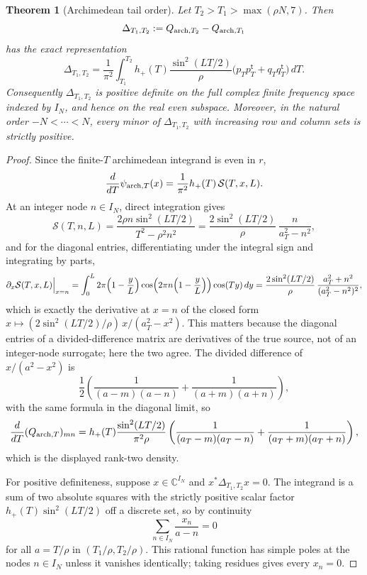 \documentclass[11pt]{article}
\theoremstyle{plain}
\newtheorem{theorem}{Theorem}[section]
\theoremstyle{definition}
\theoremstyle{remark}
\newcommand{\C}{\mathbb C}
\newcommand{\dd}{\,d}
\begin{document}
\begin{theorem}[Archimedean tail order]\label{thm:tail-order}
Let $T_2>T_1>\max(\rho N,7)$.  Then
\[
        \Delta_{T_1,T_2}:=Q_{{\rm arch},T_2}-Q_{{\rm arch},T_1}
\]
has the exact representation
\[
\Delta_{T_1,T_2}
 =
 \frac1{\pi^2}\int_{T_1}^{T_2}
 h_+(T)\frac{\sin^2(LT/2)}{\rho}
        \bigl(p_Tp_T^{\mathsf t}+q_Tq_T^{\mathsf t}\bigr)\dd T .
\]
Consequently $\Delta_{T_1,T_2}$ is positive definite on the full complex
finite frequency space indexed by $I_N$, and hence on the real even subspace.
Moreover, in the natural order $-N<\cdots<N$, every minor of
$\Delta_{T_1,T_2}$ with increasing row and column sets is strictly positive.
\end{theorem}

\begin{proof}
Since the finite-$T$ archimedean integrand is even in $r$,
\[
        \frac{d}{dT}\psi_{{\rm arch},T}(x)
        =\frac{1}{\pi^2}h_+(T)\,\mathcal S(T,x,L).
\]
At an integer node $n\in I_N$, direct integration gives
\[
 \mathcal S(T,n,L)
 =
 \frac{2\rho n\sin^2(LT/2)}{T^2-\rho^2n^2}
 =
 \frac{2\sin^2(LT/2)}{\rho}\,\frac{n}{a_T^2-n^2},
\]
and for the diagonal entries, differentiating under the integral sign and
integrating by parts,
\[
 \partial_x\mathcal S(T,x,L)\Big|_{x=n}
 =\int_0^L 2\pi\Bigl(1-\frac yL\Bigr)
   \cos\Bigl(2\pi n\Bigl(1-\frac yL\Bigr)\Bigr)\cos(Ty)\dd y
 =\frac{2\sin^2(LT/2)}{\rho}\,\frac{a_T^2+n^2}{(a_T^2-n^2)^2},
\]
which is exactly the derivative at $x=n$ of the closed form
$x\mapsto(2\sin^2(LT/2)/\rho)\,x/(a_T^2-x^2)$.  This matters because the
diagonal entries of a divided-difference matrix are derivatives of the true
source, not of an integer-node surrogate; here the two agree.  The divided
difference of $x/(a^2-x^2)$ is
\[
 \frac12\left(
 \frac1{(a-m)(a-n)}+\frac1{(a+m)(a+n)}
 \right),
\]
with the same formula in the diagonal limit, so
\[
 \frac{d}{dT}(Q_{{\rm arch},T})_{mn}
 =
 h_+(T)\frac{\sin^2(LT/2)}{\pi^2\rho}
 \left(
 \frac1{(a_T-m)(a_T-n)}
 +\frac1{(a_T+m)(a_T+n)}
 \right),
\]
which is the displayed rank-two density.

For positive definiteness, suppose $x\in\C^{I_N}$ and
$x^*\Delta_{T_1,T_2}x=0$.  The integrand is a sum of two absolute squares
with the strictly positive scalar factor $h_+(T)\sin^2(LT/2)$ off a discrete
set, so by continuity
\[
        \sum_{n\in I_N}\frac{x_n}{a-n}=0
\]
for all $a=T/\rho$ in $(T_1/\rho,T_2/\rho)$.  This rational function has
simple poles at the nodes $n\in I_N$ unless it vanishes identically; taking
residues gives every $x_n=0$.


\end{proof}
\end{document}
